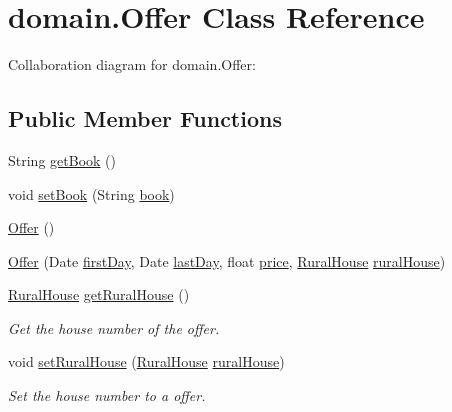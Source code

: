 \hypertarget{classdomain_1_1Offer}{}\section{domain.\+Offer Class Reference}
\label{classdomain_1_1Offer}


Collaboration diagram for domain.\+Offer\+:
\subsection*{Public Member Functions}
\begin{DoxyCompactItemize}
\item 
String \mbox{\hyperlink{classdomain_1_1Offer_afebfadadf66b46ce87a9777d01fc2a41}{get\+Book}} ()
\item 
void \mbox{\hyperlink{classdomain_1_1Offer_a35ebc81c0ebfe427d7bb68abaf811852}{set\+Book}} (String \mbox{\hyperlink{classdomain_1_1Offer_afea0a91aa8cd1382181dd2071b7c6a04}{book}})
\item 
\mbox{\hyperlink{classdomain_1_1Offer_ae82665e8df101e5a20b41dc06f74a789}{Offer}} ()
\item 
\mbox{\hyperlink{classdomain_1_1Offer_ae977cf0dae1332eb9d0b97252cc15078}{Offer}} (Date \mbox{\hyperlink{classdomain_1_1Offer_ac30c7d7ca38555fecc523259c15bd6b0}{first\+Day}}, Date \mbox{\hyperlink{classdomain_1_1Offer_a4d415274c0e120dd3e66e4ad46d7e2b2}{last\+Day}}, float \mbox{\hyperlink{classdomain_1_1Offer_a194cfe9363c5bd9e745f56978b03e7fd}{price}}, \mbox{\hyperlink{classdomain_1_1RuralHouse}{Rural\+House}} \mbox{\hyperlink{classdomain_1_1Offer_a122573abd92911b25cde7d7e84f488f5}{rural\+House}})
\item 
\mbox{\hyperlink{classdomain_1_1RuralHouse}{Rural\+House}} \mbox{\hyperlink{classdomain_1_1Offer_a3804f5f9ad3a3bf380e55389ccfa9dba}{get\+Rural\+House}} ()
\begin{DoxyCompactList}\small\item\em Get the house number of the offer. \end{DoxyCompactList}\item 
void \mbox{\hyperlink{classdomain_1_1Offer_a2050ed4cf76a2a2863d08e89bdf4a7df}{set\+Rural\+House}} (\mbox{\hyperlink{classdomain_1_1RuralHouse}{Rural\+House}} \mbox{\hyperlink{classdomain_1_1Offer_a122573abd92911b25cde7d7e84f488f5}{rural\+House}})
\begin{DoxyCompactList}\small\item\em Set the house number to a offer. \end{DoxyCompactList}\item 

\end{DoxyCompactItemize}
